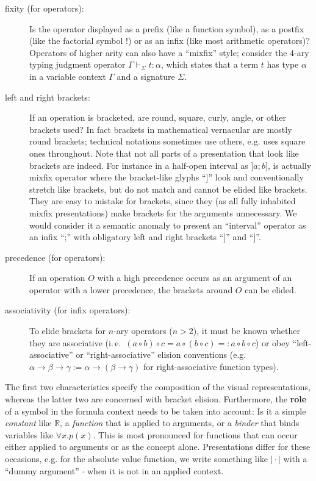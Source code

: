 \begin{description}
\item[fixity (for operators):] Is the operator displayed as a prefix (like a function
  symbol), as a postfix (like the factorial symbol $!$) or as an infix (like most
  arithmetic operators)?  Operators of higher arity can also have a ``mixfix'' style;
  consider the 4-ary typing judgment operator $\Gamma\vdash_\Sigma t\colon\alpha$, which
  states that a term $t$ has type $\alpha$ in a variable context $\Gamma$ and a signature
  $\Sigma$.
\item[left and right brackets:] If an operation is bracketed, are round, square, curly,
  angle, or other brackets used? In fact brackets in mathematical vernacular are mostly
  round brackets; technical notations sometimes use others, e.g. {\mathematica} uses
  square ones throughout. Note that not all parts of a presentation that look like
  brackets are indeed. For instance in a half-open interval as $]a;b]$, is actually mixfix
  operator where the bracket-like glyphs ``$]$'' look and conventionally stretch like
  brackets, but do not match and cannot be elided like brackets. They are easy to mistake
  for brackets, since they (as all fully inhabited mixfix presentations) make brackets for
  the arguments unnecessary. We would consider it a semantic anomaly to present an
  ``interval'' operator as an infix ``;'' with obligatory left and right brackets ``$]$''
  and ``$]$''.
\item[precedence (for operators):] If an operation $O$ with a high precedence occurs as an
  argument of an operator with a lower precedence, the brackets around $O$ can be
  elided.
\item[associativity (for infix operators):] To elide brackets for $n$-ary operators
  ($n>2$), it must be known whether they are associative (i.\,e.\ $(a\circ b)\circ c =
  a\circ(b\circ c) =: a\circ b\circ c$) or obey ``left-associative'' or
  ``right-associative'' elision conventions (e.g.
  $\alpha\to\beta\to\gamma:=\alpha\to(\beta\to\gamma)$ for right-associative function
  types).
\end{description}
The first two characteristics specify the composition of the visual representations,
whereas the latter two are concerned with bracket elision. Furthermore, the {\bf{role}} of
a symbol in the formula context needs to be taken into account: Is it a simple
{\emph{constant}} like $\mathbb{R}$, a {\emph{function}} that is applied to arguments, or
a {\emph{binder}} that binds variables like $\forall x.p(x)$. This is most pronounced for
functions that can occur either applied to arguments or as the concept alone.
Presentations differ for these occasions, e.g. for the absolute value function, we write
something like $\bigl|\cdot\bigr|$ with a ``dummy argument'' $\cdot$ when it is not in an
applied context.

